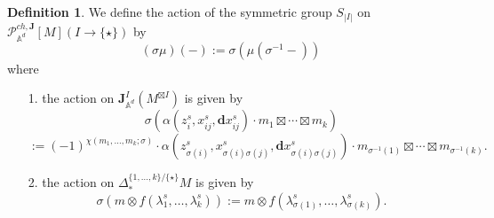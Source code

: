 \documentclass[11pt]{amsart}
\theoremstyle{definition}
\newtheorem{defn}[thm]{Definition}
\theoremstyle{remark}
\numberwithin{equation}{section}
\begin{document}
\begin{defn}
    We define the action of the symmetric group $S_{|I|}$ on $\mathcal{P}^{ch,\mathbf{J}}_{\mathbb{A}^d}[M](I\rightarrow \{\star\})$ by
$$
(\sigma\mu)(-):=\sigma\left(\mu(\sigma^{-1}-)\right)
$$
where
\begin{itemize}
  \item[1.] the action on $\mathbf{J}_{\mathbb{A}^d}^{I}(M^{\boxtimes I})$ is given by 
    $$
    \sigma\left(\alpha(z^s_i,x^s_{ij},\mathbf{d}x^s_{ij})\cdot m_1\boxtimes\cdots\boxtimes m_k\right)
    $$
    $$
    :=(-1)^{\chi(m_1,\dots,m_k;\sigma)}\cdot\alpha(z^s_{\sigma(i)},x^s_{\sigma(i)\sigma(j)},\mathbf{d}x^s_{\sigma(i)\sigma(j)})\cdot m_{\sigma^{-1}(1)}\boxtimes\cdots\boxtimes m_{\sigma^{-1}(k)}.
    $$
  \item[2.] the action on $\Delta_*^{\{1,\dots,k\}/\{\star\}}M$ is given by 
    $$
    \sigma\left(m\otimes f(\lambda^s_1,\dots,\lambda^s_k)\right):=m\otimes f(\lambda^s_{\sigma(1)},\dots,\lambda^s_{\sigma(k)}).
    $$
\end{itemize}
\end{defn}
\end{document}
